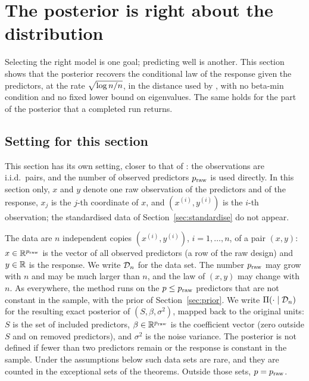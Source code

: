 \section{The posterior is right about the distribution}\label{sec:distribution}

Selecting the right model is one goal; predicting well is another. This section shows that the posterior recovers the
conditional law of the response given the predictors, at the rate $\sqrt{\log n/n}$, in the distance used by \citet{SongLiang2015},
with no beta-min condition and no fixed lower bound on eigenvalues. The same holds for the part of the posterior that a
completed run returns.

\subsection{Setting for this section}\label{sec:dist-setting}

This section has its own setting, closer to that of \citet{SongLiang2015}: the observations are i.i.d.\ pairs, and the
number of observed predictors $p_{\mathrm{raw}}$ is used directly. In this section only, $x$ and $y$ denote one raw observation of
the predictors and of the response, $x_j$ is the $j$-th coordinate of $x$, and $(x^{(i)},y^{(i)})$ is the $i$-th observation; the
standardised data of Section~\ref{sec:standardise} do not appear.

The data are $n$ independent copies $(x^{(i)},y^{(i)})$, $i=1,\dots,n$, of a pair $(x,y)$: $x\in\mathbb{R}^{p_{\mathrm{raw}}}$ is the vector of all
observed predictors (a row of the raw design) and $y\in\mathbb{R}$ is the response. We write $\mathcal D_n$ for the data set. The number
$p_{\mathrm{raw}}$ may grow with $n$ and may be much larger than $n$, and the law of $(x,y)$ may change with $n$. As everywhere,
the method runs on the $p\le p_{\mathrm{raw}}$ predictors that are not constant in the sample, with the prior of
Section~\ref{sec:prior}. We write $\Pi(\cdot\mid\mathcal D_n)$ for the resulting exact posterior of $(S,\beta,\sigma^2)$, mapped
back to the original units: $S$ is the set of included predictors, $\beta\in\mathbb{R}^{p_{\mathrm{raw}}}$ is the coefficient vector (zero
outside $S$ and on removed predictors), and $\sigma^2$ is the noise variance. The posterior is not defined if fewer than two predictors remain or the
response is constant in the sample. Under the assumptions below such data sets are rare, and they are counted in the
exceptional sets of the theorems. Outside those sets, $p=p_{\mathrm{raw}}$.

